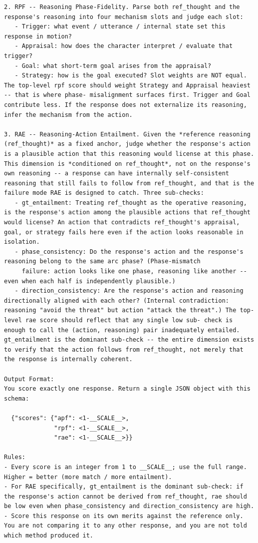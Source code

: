 \documentclass[11pt]{article}
\begin{document}
\begin{table}[htbp]
\begin{lstlisting}[basicstyle=\ttfamily\scriptsize]
2. RPF -- Reasoning Phase-Fidelity. Parse both ref_thought and the response's reasoning into four mechanism slots and judge each slot:
   - Trigger: what event / utterance / internal state set this response in motion?
   - Appraisal: how does the character interpret / evaluate that trigger?
   - Goal: what short-term goal arises from the appraisal?
   - Strategy: how is the goal executed? Slot weights are NOT equal. The top-level rpf score should weight Strategy and Appraisal heaviest -- that is where phase- misalignment surfaces first. Trigger and Goal contribute less. If the response does not externalize its reasoning, infer the mechanism from the action.

3. RAE -- Reasoning-Action Entailment. Given the *reference reasoning (ref_thought)* as a fixed anchor, judge whether the response's action is a plausible action that this reasoning would license at this phase. This dimension is *conditioned on ref_thought*, not on the response's own reasoning -- a response can have internally self-consistent reasoning that still fails to follow from ref_thought, and that is the failure mode RAE is designed to catch. Three sub-checks:
   - gt_entailment: Treating ref_thought as the operative reasoning, is the response's action among the plausible actions that ref_thought would license? An action that contradicts ref_thought's appraisal, goal, or strategy fails here even if the action looks reasonable in isolation.
   - phase_consistency: Do the response's action and the response's reasoning belong to the same arc phase? (Phase-mismatch
     failure: action looks like one phase, reasoning like another -- even when each half is independently plausible.)
   - direction_consistency: Are the response's action and reasoning directionally aligned with each other? (Internal contradiction: reasoning "avoid the threat" but action "attack the threat".) The top-level rae score should reflect that any single low sub- check is enough to call the (action, reasoning) pair inadequately entailed. gt_entailment is the dominant sub-check -- the entire dimension exists to verify that the action follows from ref_thought, not merely that the response is internally coherent.

Output Format:
You score exactly one response. Return a single JSON object with this schema:

  {"scores": {"apf": <1-__SCALE__>,
              "rpf": <1-__SCALE__>,
              "rae": <1-__SCALE__>}}

Rules:
- Every score is an integer from 1 to __SCALE__; use the full range. Higher = better (more match / more entailment).
- For RAE specifically, gt_entailment is the dominant sub-check: if the response's action cannot be derived from ref_thought, rae should be low even when phase_consistency and direction_consistency are high.
- Score this response on its own merits against the reference only. You are not comparing it to any other response, and you are not told which method produced it.


\end{lstlisting}
\end{table}
\end{document}
